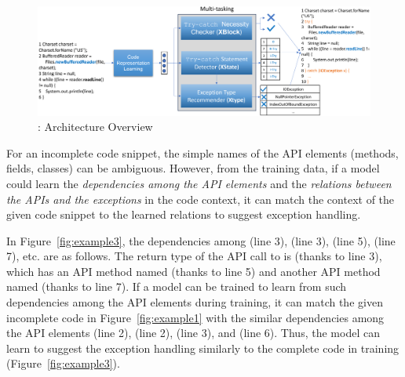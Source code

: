 


\begin{figure}[htp]
\begin{center}
\includegraphics[width=5.65in]{overview-5.png}
\vspace{-10pt}
\caption{{\tool}: Architecture Overview}
\label{overview}
\end{center}
\end{figure}

For an incomplete code snippet, the simple names of the API elements
(methods, fields, classes) can be ambiguous. However, from the
training data, if a model could learn the {\em dependencies among the
  API elements} and the {\em relations between the APIs and the
  exceptions} in the code context, it can match the context of the
given code snippet to the learned relations to suggest exception
handling.

%
In Figure~\ref{fig:example3}, the dependencies among 
(line 3),  (line 3), 
(line 5),  (line 7), etc. are as follows. The return type of
the API call to  is  (thanks to
line 3), which has an API method named  (thanks
to line 5) and another API method named  (thanks to line
7). If a model can be trained to learn from such dependencies among
the API elements during training, it can match the given incomplete code in
Figure~\ref{fig:example1} with the similar dependencies among the API
elements  (line 2),  (line
2),  (line 3), and  (line 6). Thus,
the model can learn to suggest the exception handling similarly to the
complete code in training (Figure~\ref{fig:example3}).

